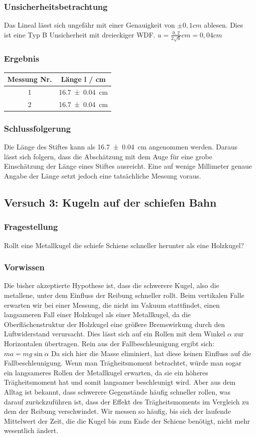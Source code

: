 \documentclass[
	a4paper,
	12pt,
	pagesize,
	ngerman
]{scrartcl}
\begin{document}
	\subsubsection{Unsicherheitsbetrachtung}
	Das Lineal lässt sich ungefähr mit einer Genauigkeit von $\pm 0,1 \si{cm}$ ablesen. Dies ist eine Typ B Unsicherheit mit dreieckiger WDF.
	$u=\frac{0,2}{2 \sqrt{6}} \si{cm}=0,04 \si{cm}$
	\subsubsection{Ergebnis}
	\begin{tabular}{| c | c |}
		\hline
		Messung Nr. & Länge l  / \si{cm}\\ \hline
		1 & \SI{16,7 \pm 0,04}{cm}\\
		2 & \SI{16,7 \pm 0,04}{cm}\\ \hline
	\end{tabular}
	\subsubsection{Schlussfolgerung}
	Die Länge des Stiftes kann als \SI{16,7 \pm 0,04}{cm} angenommen werden. Daraus lässt sich folgern, dass die Abschätzung mit dem Auge für eine grobe Einschätzung der Länge eines Stiftes ausreicht. Eine auf wenige Millimeter genaue Angabe der Länge setzt jedoch eine tatsächliche Messung voraus.
	\newpage
	\subsection{Versuch 3: Kugeln auf der schiefen Bahn}
	\subsubsection{Fragestellung}
	Rollt eine Metallkugel die schiefe Schiene schneller herunter als eine Holzkugel?
	\subsubsection{Vorwissen}
	Die bisher akzeptierte Hypothese ist, dass die schwerere Kugel, also die metallene, unter dem Einfluss der Reibung schneller rollt. Beim vertikalen Falle erwarten wir bei einer Messung, die nicht im Vakuum stattfindet, einen langsameren Fall einer Holzkugel als einer Metallkugel, da die Oberflächenstruktur der Holzkugel eine größere Bremswirkung durch den Luftwiderstand verursacht. Dies lässt sich auf ein Rollen mit dem Winkel $\alpha$ zur Horizontalen übertragen. Rein aus der Fallbeschleunigung ergibt sich: 
	$ma=mg \sin \alpha$
	Da sich hier die Masse eliminiert, hat diese keinen Einfluss auf die Fallbeschleunigung. Wenn man Trägheitsmoment betrachtet, würde man sogar ein langsameres Rollen der Metallkugel erwarten, da sie ein höheres Trägheitsmoment hat und somit langsamer beschleunigt wird.
	Aber aus dem Alltag ist bekannt, dass schwerere Gegenstände häufig schneller rollen, was darauf zurückzuführen ist, dass der Effekt des Trägheitsmoments im Vergleich zu dem der Reibung verschwindet.
	Wir messen so häufig, bis sich der laufende Mittelwert der Zeit, die die Kugel bis zum Ende der Schiene benötigt, nicht mehr wesentlich ändert.
\end{document}
